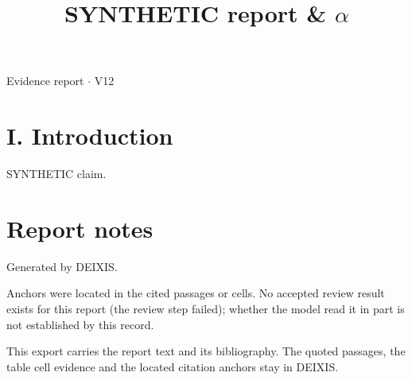 \documentclass[journal]{IEEEtran}
\begin{document}
\title{SYNTHETIC report \& \ensuremath{\alpha}}

\maketitle

\noindent Evidence report \ensuremath{\cdot} V12

\section*{I. Introduction}

SYNTHETIC claim. \cite{Synth26}

\section*{Report notes}

Generated by DEIXIS.

Anchors were located in the cited passages or cells. No accepted review result exists for this report (the review step failed); whether the model read it in part is not established by this record.

This export carries the report text and its bibliography. The quoted passages, the table cell evidence and the located citation anchors stay in DEIXIS.




\end{document}
